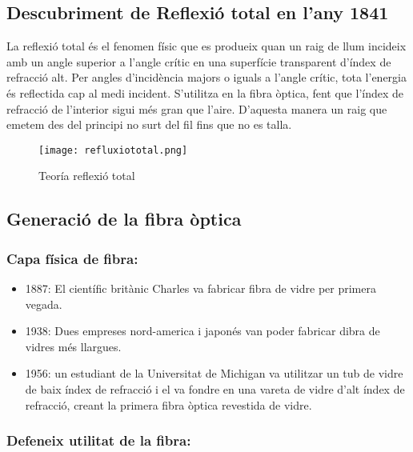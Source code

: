 
\subsection*{Descubriment de Reflexió total en l'any 1841}

La reflexió total és el fenomen físic que es produeix quan un raig de llum incideix amb un angle superior a l'angle crític en una superfície transparent d'índex de refracció alt. Per angles d'incidència majors o iguals a l'angle crític, tota l'energia és reflectida cap al medi incident.
S'utilitza en la fibra òptica, fent que l'índex de refracció de l'interior sigui més gran que l'aire. D'aquesta manera un raig que emetem des del principi no surt del fil fins que no es talla. 

\begin{figure}[h!]
    \centering
    \texttt{[image: refluxiototal.png]}
    \caption{Teoría reflexió total}
\end{figure}


\subsection*{Generació de la fibra òptica}

\subsubsection*{Capa física de fibra:}

\begin{itemize}
    \item 1887: El científic britànic Charles va fabricar fibra de vidre per primera vegada.
    \item 1938: Dues empreses nord-america i japonés van poder fabricar dibra de vidres més llargues.
    \item 1956: un estudiant de la Universitat de Michigan va utilitzar un tub de vidre de baix índex de refracció i el va fondre en una vareta de vidre d'alt índex de refracció, creant la primera fibra òptica revestida de vidre. 

\end{itemize}

\subsubsection*{Defeneix utilitat de la fibra:}

